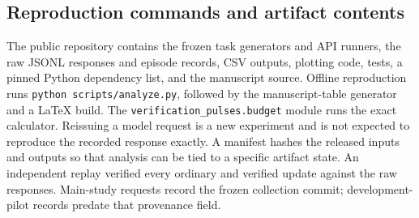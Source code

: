 \documentclass[11pt]{article}
\theoremstyle{remark}\newtheorem{remark}[theorem]{Remark}
\begin{document}
\PredictionTable

\subsection{Reproduction commands and artifact contents}
The public repository contains the frozen task generators and API runners, the raw JSONL responses and episode records, CSV outputs, plotting code, tests, a pinned Python dependency list, and the manuscript source. Offline reproduction runs \texttt{python scripts/analyze.py}, followed by the manuscript-table generator and a LaTeX build. The \texttt{verification\_pulses.budget} module runs the exact calculator. Reissuing a model request is a new experiment and is not expected to reproduce the recorded response exactly. A manifest hashes the released inputs and outputs so that analysis can be tied to a specific artifact state. An independent replay verified every ordinary and verified update against the raw responses. Main-study requests record the frozen collection commit; development-pilot records predate that provenance field.
\end{document}
